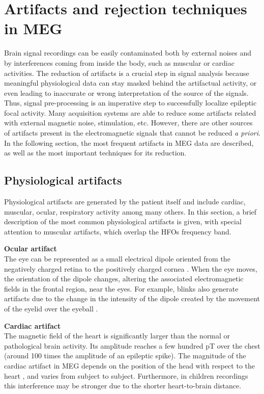 \section{Artifacts and rejection techniques in MEG}

Brain signal recordings can be easily contaminated both by external noises and by interferences coming from inside the body, such as muscular or cardiac activities. The reduction of artifacts is a crucial step in signal analysis because meaningful physiological data can stay masked behind the artifactual activity, or even leading to inaccurate or wrong interpretation of the source of the signals. Thus, signal pre-processing is an imperative step to successfully localize epileptic focal activity. Many acquisition systems are able to reduce some artifacts related with external magnetic noise, stimulation, etc. However, there are other sources of artifacts present in the electromagnetic signals that cannot be reduced \emph{a priori}. In the following section, the most frequent artifacts in MEG data are described, as well as the most important techniques for its reduction. 

    \subsection{Physiological artifacts}
    
Physiological artifacts are generated by the patient itself and include cardiac, muscular, ocular, respiratory activity among many others. In this section, a brief description of the most common physiological artifacts is given, with special attention to muscular artifacts, which overlap the HFOs frequency band.

\textbf{Ocular artifact}
\\
The eye can be represented as a small electrical dipole oriented from the negatively charged retina to the positively charged cornea \citep{Croft2000}. When the eye moves, the orientation of the dipole changes, altering the associated electromagnetic fields in the frontal region, near the eyes. For example, blinks also generate artifacts due to the change in the intensity of the dipole created by the movement of the eyelid over the eyeball \citep{Hamalainen2004}.

\textbf{Cardiac artifact}
\\
The magnetic field of the heart is significantly larger than the normal or pathological brain activity. Its amplitude reaches a few hundred pT over the chest (around 100 times the amplitude of an epileptic spike). The magnitude of the cardiac artifact in MEG depends on the position of the head with respect to the heart \citep{Hamalainen2004}, and varies from subject to subject. Furthermore, in children recordings this interference may be stronger due to the shorter heart-to-brain distance.

